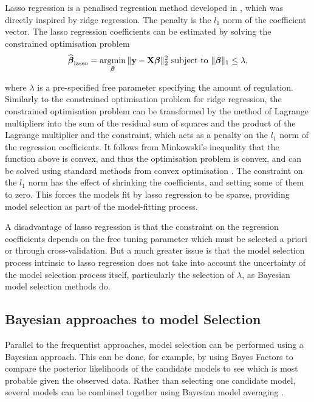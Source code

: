 Lasso regression is a penalised regression method developed in
\cite{Tibshirani1996}, which was directly inspired by ridge regression.  The
penalty is the $l_1$ norm of the coefficient vector.  The lasso regression
coefficients can be estimated by solving the constrained optimisation problem
$$
\widehat{\vbeta}_{\text{lasso}} = \argmin_\vbeta \|\vy - \mX \vbeta\|_2^2 \text{ subject to } \|\vbeta\|_1 \leq \lambda,
$$

\noindent 
where $\lambda$ is a pre-specified free parameter specifying the amount of
regulation. Similarly to the constrained optimisation problem for ridge
regression, the constrained optimisation problem can be transformed by the
method of Lagrange multipliers into the sum of the residual sum of squares and
the product of the Lagrange multiplier and the constraint, which acts as a
penalty on the $l_1$ norm of the regression coefficients. It follows from
Minkowski's inequality that the function above is convex, and thus the
optimisation problem is convex, and can be solved using standard methods from
convex optimisation \citep{Boyd2010}.  The constraint on the $l_1$ norm has the
effect of shrinking the coefficients, and setting some of them to zero. This
forces the models fit by lasso regression to be sparse, providing model
selection as part of the model-fitting process.

A disadvantage of lasso regression is that the constraint on the regression
coefficients depends on the free tuning parameter which must be selected a
priori or through cross-validation. But a much greater issue is that the model
selection process intrinsic to lasso regression does not take into account the
uncertainty of the model selection process itself, particularly the selection of
$\lambda$, as Bayesian model selection methods do.

\subsection{Bayesian approaches to model Selection}

Parallel to the frequentist approaches, model selection can be performed using
a Bayesian approach. This can be done, for example, by using Bayes Factors  to
compare the posterior likelihoods of the candidate models to see which is most
probable given the observed data\citep{Kass1993}. Rather than selecting one
candidate model, several models can be combined together using Bayesian model
averaging \citep{Hoeting1999, Raftery1997, Fernandez2001,
Papaspiliopoulos2016}.

